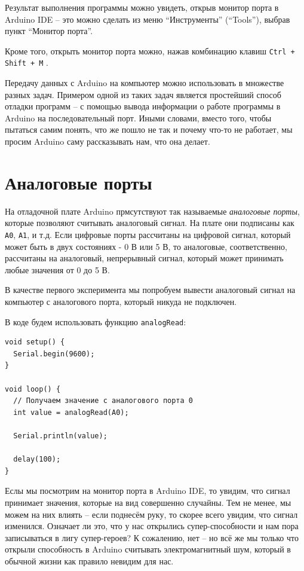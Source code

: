 \documentclass[a4paper,twoside]{book}
\newcommand{\hotkey}[1]{
  \texttt{#1}
}
\begin{document}
Результат выполнения программы можно увидеть, открыв монитор порта в Arduino IDE
-- это можно сделать из меню ``Инструменты'' (``Tools''), выбрав пункт ``Монитор
порта''.

Кроме того, открыть монитор порта можно, нажав комбинацию клавиш \hotkey{Ctrl +
  Shift + M}.

Передачу данных с Arduino на компьютер можно использовать в множестве разных
задач. Примером одной из таких задач является простейший способ отладки программ
-- с помощью вывода информации о работе программы в Arduino на последовательный
порт. Иными словами, вместо того, чтобы пытаться самим понять, что же пошло не
так и почему что-то не работает, мы просим Arduino саму рассказывать нам, что
она делает.

\section{Аналоговые порты}

На отладочной плате Arduino прмсутствуют так называемые \emph{аналоговые порты},
которые позволяют считывать аналоговый сигнал.  На плате они подписаны как
\texttt{A0}, \texttt{A1}, и т.д. Если цифровые порты рассчитаны на цифровой
сигнал, который может быть в двух состояниях - 0 В или 5 В, то аналоговые,
соответственно, рассчитаны на аналоговый, непрерывный сигнал, который может
принимать любые значения от 0 до 5 В.

В качестве первого эксперимента мы попробуем вывести аналоговый сигнал на
компьютер с аналогового порта, который никуда не подключен.

В коде будем использовать функцию \texttt{analogRead}:

\begin{verbatim}
void setup() {
  Serial.begin(9600);
}

void loop() {
  // Получаем значение с аналогового порта 0
  int value = analogRead(A0);

  Serial.println(value);

  delay(100);
}
\end{verbatim}

Еслы мы посмотрим на монитор порта в Arduino IDE, то увидим, что сигнал
принимает значения, которые на вид совершенно случайны.  Тем не менее, мы можем
на них влиять -- если поднесём руку, то скорее всего увидим, что сигнал
изменился.  Означает ли это, что у нас открылись супер-способности и нам пора
записываться в лигу супер-героев?  К сожалению, нет -- но всё же мы только что
открыли способность в Arduino считывать электромагнитный шум, который в обычной
жизни как правило невидим для нас.
\end{document}
